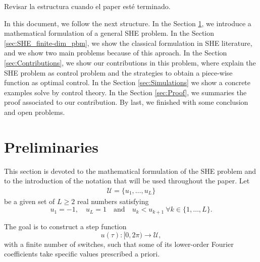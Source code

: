 \documentclass[twocolumn]{autart}    %
\begin{document}
{\color{red} Revisar la estructura cuando el paper est\'e terminado.

In this document, we follow the next structure. In the Section \ref{sec:math_formulation}, we introduce a mathematical formulation of a general SHE problem. 
%
In the Section \ref{sec:SHE_finite-dim_pbm}, we show the classical formulation in SHE literature, and we show two main problems because of this aproach. 
%
In the Section \ref{sec:Contributions}, we show our contributions in this problem, where explain the SHE problem as control problem and the strategies to obtain a piece-wise function as optimal control. 
%
In the Section \ref{sec:Simulations} we show a concrete examples solve by control theory. 
%
In the Section \ref{sec:Proof}, we summaries the proof associated to our contribution. 
%
By last, we finished with some conclusion and open problems. 
}


\section{Preliminaries}\label{sec:math_formulation}

This section is devoted to the mathematical formulation of the SHE problem and to the introduction of the notation that will be used throughout the paper.
Let 
\begin{align}\label{eq:Udef}
\mathcal{U} = \{u_1, \ldots, u_L\}
\end{align}
be a given set of $L\geq 2$ real numbers satisfying
$$
u_1 = -1, \quad u_L = 1 \quad \text{and} \quad u_k<u_{k+1} \ \forall k\in \{1,\ldots, L\}.
$$

The goal is to construct a step function
$$u(\tau):[0,2\pi)\to\mathcal U,$$
with a finite number of switches, such that some of its lower-order Fourier coefficients take specific values prescribed a priori.
\end{document}
